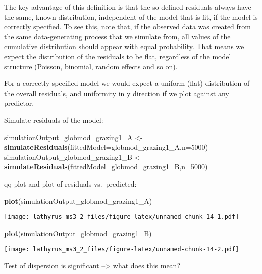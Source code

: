 \documentclass[
]{article}
\newenvironment{Shaded}{\begin{snugshade}}{\end{snugshade}}
\newcommand{\DataTypeTok}[1]{\textcolor[rgb]{0.13,0.29,0.53}{#1}}
\newcommand{\DecValTok}[1]{\textcolor[rgb]{0.00,0.00,0.81}{#1}}
\newcommand{\KeywordTok}[1]{\textcolor[rgb]{0.13,0.29,0.53}{\textbf{#1}}}
\newcommand{\NormalTok}[1]{#1}
\newcommand{\StringTok}[1]{\textcolor[rgb]{0.31,0.60,0.02}{#1}}
\begin{document}
The key advantage of this definition is that the so-defined residuals
always have the same, known distribution, independent of the model that
is fit, if the model is correctly specified. To see this, note that, if
the observed data was created from the same data-generating process that
we simulate from, all values of the cumulative distribution should
appear with equal probability. That means we expect the distribution of
the residuals to be flat, regardless of the model structure (Poisson,
binomial, random effects and so on).

For a correctly specified model we would expect a uniform (flat)
distribution of the overall residuals, and uniformity in y direction if
we plot against any predictor.

Simulate residuals of the model:

\begin{Shaded}
\begin{Highlighting}[]
\NormalTok{simulationOutput_globmod_grazing1_A <-}\StringTok{ }
\StringTok{  }\KeywordTok{simulateResiduals}\NormalTok{(}\DataTypeTok{fittedModel=}\NormalTok{globmod_grazing1_A,}\DataTypeTok{n=}\DecValTok{5000}\NormalTok{)}
\NormalTok{simulationOutput_globmod_grazing1_B <-}
\StringTok{  }\KeywordTok{simulateResiduals}\NormalTok{(}\DataTypeTok{fittedModel=}\NormalTok{globmod_grazing1_B,}\DataTypeTok{n=}\DecValTok{5000}\NormalTok{)}
\end{Highlighting}
\end{Shaded}

qq-plot and plot of residuals vs.~predicted:

\begin{Shaded}
\begin{Highlighting}[]
\KeywordTok{plot}\NormalTok{(simulationOutput_globmod_grazing1_A)}
\end{Highlighting}
\end{Shaded}

\texttt{[image: lathyrus\_ms3\_2\_files/figure-latex/unnamed-chunk-14-1.pdf]}

\begin{Shaded}
\begin{Highlighting}[]
\KeywordTok{plot}\NormalTok{(simulationOutput_globmod_grazing1_B)}
\end{Highlighting}
\end{Shaded}

\texttt{[image: lathyrus\_ms3\_2\_files/figure-latex/unnamed-chunk-14-2.pdf]}

Test of dispersion is significant --\textgreater{} what does this mean?
\end{document}
